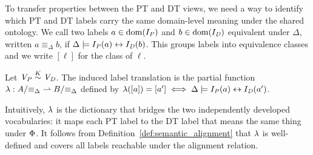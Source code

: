 To transfer properties between the PT and DT views, we need a way to identify which PT and DT labels carry the same domain-level meaning under the shared ontology. We call two labels $a \in \mathrm{dom}(I_{\mathit{P}})$ and $b \in \mathrm{dom}(I_{\mathit{D}})$ equivalent under $\Delta$, written $a \equiv_\Delta b$, if $\Delta \models I_{\mathit{P}}(a) \leftrightarrow I_{\mathit{D}}(b)$. This groups labels into equivalence classes and we write $[\ell]$ for the class of $\ell$.


\begin{definition} \label{def:tau} Let $\mathit{V_P}\stackrel{K}{\sim}\mathit{V_D}$. The {induced label translation} is the partial function $\lambda : A/{\equiv_\Delta} \rightharpoonup B/{\equiv_\Delta}$ defined by $\lambda([a]) = [a'] \iff \Delta \models I_{\mathit{P}}(a) \leftrightarrow I_{\mathit{D}}(a')$. 
\end{definition}

Intuitively, $\lambda$ is the dictionary that bridges the two independently developed vocabularies: it maps each PT label to the DT label that means the same thing under $\Phi$. It follows from Definition~\ref{def:semantic_alignment} that $\lambda$ is well-defined and covers all labels reachable under the alignment relation.


%
%
%
%



